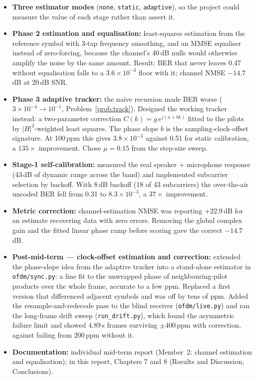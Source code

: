\documentclass[11pt,a4paper]{report}
\begin{document}
\begin{itemize}
    \item \textbf{Three estimator modes} (\texttt{none}, \texttt{static},
    \texttt{adaptive}), so the project could measure the value of each stage rather
    than assert it.
    \item \textbf{Phase 2 estimation and equalisation:} least-squares estimation from the
    reference symbol with 3-tap frequency smoothing, and an MMSE equaliser instead of
    zero-forcing, because the channel's 40\,dB nulls would otherwise amplify the noise by
    the same amount. Result: BER that never leaves 0.47 without equalisation falls to a
    $3.6\times10^{-3}$ floor with it; channel NMSE $-14.7$\,dB at 20\,dB SNR.
    \item \textbf{Phase 3 adaptive tracker:} the naive recursion made BER worse
    ($3\times10^{-4}\rightarrow10^{-1}$, Problem~\ref{prob:track}). Designed the working
    tracker instead: a two-parameter correction $C(k)=g\,e^{j(a+bk)}$ fitted to the
    pilots by $|H|^2$-weighted least squares. The phase slope $b$ is the
    sampling-clock-offset signature. At 100\,ppm this gives $3.8\times10^{-3}$ against
    0.51 for static calibration, a $135\times$ improvement. Chose $\mu=0.15$ from the
    step-size sweep.
    \item \textbf{Stage-1 self-calibration:} measured the real speaker + microphone
    response (43\,dB of dynamic range across the band) and implemented subcarrier
    selection by backoff. With 8\,dB backoff (18 of 43 subcarriers) the over-the-air
    uncoded BER fell from 0.31 to $8.3\times10^{-3}$, a $37\times$ improvement.
    \item \textbf{Metric correction:} channel-estimation NMSE was reporting $+22.9$\,dB
    for an estimate recovering data with zero errors. Removing the global complex gain
    and the fitted linear phase ramp before scoring gave the correct $-14.7$\,dB.
    \item \textbf{Post-mid-term --- clock-offset estimation and correction:} extended
    the phase-slope idea from the adaptive tracker into a stand-alone estimator in
    \texttt{ofdm/sync.py}: a line fit to the unwrapped phase of
    neighbouring-pilot products over the whole frame, accurate to a few ppm. Replaced
    a first version that differenced adjacent symbols and was off by tens of ppm. Added
    the resample-and-redecode pass to the blind receiver (\texttt{ofdm/live.py}) and ran
    the long-frame drift sweep (\texttt{run\_drift.py}), which found the
    asymmetric failure limit and showed 4.89\,s frames surviving $\pm400$\,ppm with
    correction, against failing from 200\,ppm without it.
    \item \textbf{Documentation:} individual mid-term report (Member~2: channel
    estimation and equalisation); in this report, Chapters 7 and 8 (Results and
    Discussion, Conclusions).
\end{itemize}
\end{document}
